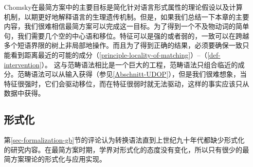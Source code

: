 Chomsky在最简方案中的主要目标是简化针对语言形式属性的理论假设以及计算机制，以期更好地解释语言的生理遗传机制。但是，如果我们总结一下本章的主要内容，我们很难相信最简方案可以完成这一目标。为了得到一个不及物动词的简单句，我们需要几个空的中心语和移位。特征可以是强的或者弱的，一致可以在跨越多个短语界限的树上非局部地操作。而且为了得到正确的结果，必须要确保一致只能看到距离最近的可能的成分（\ref{principle-locality-of-matching}）--（\ref{def-intervention}）。
这与范畴语法相比是一个巨大的工程，范畴语法只组合临近的成分。范畴语法可以从输入获得（参见\ref{Abschnitt-UDOP}），但是我们很难想象，当特征很强时，它们会驱动移位，而在特征很弱时就无法驱动，这样的事实应该只从数据中获得。

\subsection{形式化}
\label{sec-formalization-minimalism}

第\ref{sec-formalization-gb}节的评论认为转换语法直到上世纪九十年代都缺少形式化的研究内容。在最简方案时期，学界对形式化的态度没有变化，所以只有很少的最简方案理论的形式化与应用实现。

